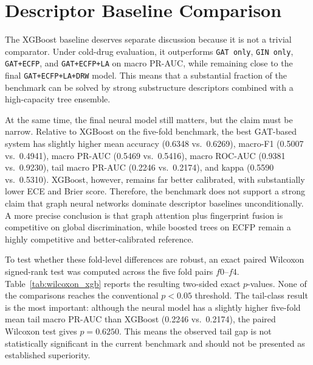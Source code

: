 \section{Descriptor Baseline Comparison}
The XGBoost baseline deserves separate discussion because it is not a trivial comparator. Under cold-drug evaluation, it outperforms \texttt{GAT only}, \texttt{GIN only}, \texttt{GAT+ECFP}, and \texttt{GAT+ECFP+LA} on macro PR-AUC, while remaining close to the final \texttt{GAT+ECFP+LA+DRW} model. This means that a substantial fraction of the benchmark can be solved by strong substructure descriptors combined with a high-capacity tree ensemble.

At the same time, the final neural model still matters, but the claim must be narrow. Relative to XGBoost on the five-fold benchmark, the best GAT-based system has slightly higher mean accuracy (0.6348 vs.\ 0.6269), macro-F1 (0.5007 vs.\ 0.4941), macro PR-AUC (0.5469 vs.\ 0.5416), macro ROC-AUC (0.9381 vs.\ 0.9230), tail macro PR-AUC (0.2246 vs.\ 0.2174), and kappa (0.5590 vs.\ 0.5310). XGBoost, however, remains far better calibrated, with substantially lower ECE and Brier score. Therefore, the benchmark does not support a strong claim that graph neural networks dominate descriptor baselines unconditionally. A more precise conclusion is that graph attention plus fingerprint fusion is competitive on global discrimination, while boosted trees on ECFP remain a highly competitive and better-calibrated reference.

To test whether these fold-level differences are robust, an exact paired Wilcoxon signed-rank test was computed across the five fold pairs \(f0\)--\(f4\). Table~\ref{tab:wilcoxon_xgb} reports the resulting two-sided exact \(p\)-values. None of the comparisons reaches the conventional \(p<0.05\) threshold. The tail-class result is the most important: although the neural model has a slightly higher five-fold mean tail macro PR-AUC than XGBoost (0.2246 vs.\ 0.2174), the paired Wilcoxon test gives \(p=0.6250\). This means the observed tail gap is not statistically significant in the current benchmark and should not be presented as established superiority.


